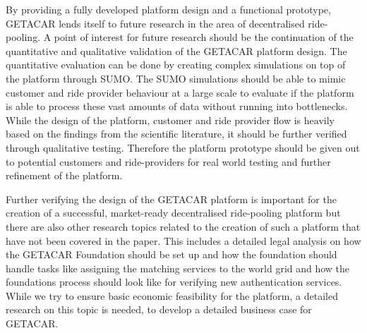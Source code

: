By providing a fully developed platform design and a functional prototype, GETACAR lends itself to future research in the area of decentralised ride-pooling.
A point of interest for future research should be the continuation of the quantitative and qualitative validation of the GETACAR platform design. The quantitative evaluation can be done by creating complex simulations on top of the platform through SUMO. The SUMO simulations should be able to mimic customer and ride provider behaviour at a large scale to evaluate if the platform is able to process these vast amounts of data without running into bottlenecks. While the design of the platform, customer and ride provider flow is heavily based on the findings from the scientific literature, it should be further verified through qualitative testing. Therefore the platform prototype should be given out to potential customers and ride-providers for real world testing and further refinement of the platform.

Further verifying the design of the GETACAR platform is important for the creation of a successful, market-ready decentralised ride-pooling platform but there are also other research topics related to the creation of such a platform that have not been covered in the paper. This includes a detailed legal analysis on how the GETACAR Foundation should be set up and how the foundation should handle tasks like assigning the matching services to the world grid and how the foundations process should look like for verifying new authentication services.
While we try to ensure basic economic feasibility for the platform, a detailed research on this topic is needed, to develop a detailed business case for GETACAR.